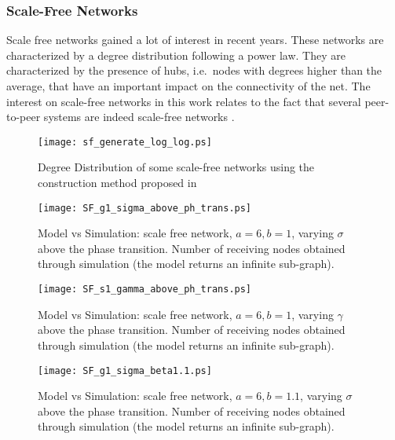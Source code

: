 \documentclass[10pt, conference, compsocconf]{IEEEtran}
\begin{document}
\subsubsection{Scale-Free Networks}

Scale free networks gained a lot of interest in recent years. These networks are characterized by a degree distribution following a power law. 
They are characterized by the presence of hubs, i.e.~nodes with degrees higher than the average, that have an important impact on the connectivity of the net.
The interest on scale-free networks in this work relates to the fact that several peer-to-peer systems are indeed scale-free networks \cite{simutools,newman03thestructure}.

\begin{figure}
   \centering
   \texttt{[image: sf\_generate\_log\_log.ps]}
   \caption{Degree Distribution of some scale-free networks using the construction method proposed in \cite{Aiello00arandom}}
   \label{fig:fig_rete_Aiello}
\end{figure}

\begin{figure}[t]
   \centering
   \texttt{[image: SF\_g1\_sigma\_above\_ph\_trans.ps]}
   \caption{Model vs Simulation: scale free network, $a = 6, b = 1$, varying $\sigma$ above the phase transition. Number of receiving nodes obtained through simulation (the model returns an infinite sub-graph).}
   \label{fig:SF_confronto_g_above}
\end{figure}

\begin{figure}[t]
   \centering
   \texttt{[image: SF\_s1\_gamma\_above\_ph\_trans.ps]}
   \caption{Model vs Simulation: scale free network, $a = 6, b = 1$, varying $\gamma$ above the phase transition. Number of receiving nodes obtained through simulation (the model returns an infinite sub-graph).}
   \label{fig:SF_confronto_s_above}
\end{figure}

\begin{figure}[t]
   \centering
   \texttt{[image: SF\_g1\_sigma\_beta1.1.ps]}
   \caption{Model vs Simulation: scale free network, $a = 6, b = 1.1$, varying $\sigma$ above the phase transition. Number of receiving nodes obtained through simulation (the model returns an infinite sub-graph).}
   \label{fig:SF_confronto_g_beta1.1}
\end{figure}
\end{document}

